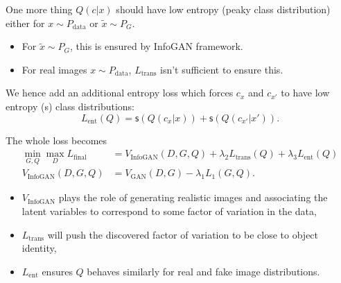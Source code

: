 \documentclass[xcolor={svgnames}]{beamer}
\begin{document}

\begin{frame}{One more thing}
  $Q(c|x)$ should have low entropy (peaky class distribution) either for
  $x \sim P_{\text{data}}$ or $\tilde{x} \sim P_G$.

  \begin{itemize}
    \item For $\tilde{x} \sim P_G$, this is ensured by InfoGAN framework.
    \item For real images $x \sim P_{\text{data}}$, $L_{\text{trans}}$ isn't
      sufficient to ensure this.
  \end{itemize}
  We hence add an additional entropy loss which forces $c_x$ and $c_{x'}$ to 
  have low entropy (s) class distributions:
  \[
    L_{\text{ent}}(Q) = \mathsf{s}(Q(c_x | x)) + \mathsf{s}(Q(c_{x'} | x')).
  \]
\end{frame}


\begin{frame}
  The whole loss becomes
  \[
    \begin{split}
      \min_{G, Q}\max_D L_{\text{final}} &= V_{\text{InfoGAN}}(D, G, Q) + 
      \lambda_2 L_{\text{trans}}(Q) + \lambda_3 L_{\text{ent}}(Q) \\
      V_{\text{InfoGAN}}(D, G, Q) &= 
      V_{\text{GAN}}(D,G) - \lambda_1 L_1(G,Q).
    \end{split}
  \]
  
  \begin{itemize}
    \item $V_{\text{InfoGAN}}$ plays the role of generating realistic images 
      and associating the latent variables to correspond to some factor of 
      variation in the data, 
    \item $L_{\text{trans}}$ will push the discovered factor of variation to 
      be close to object identity,
    \item $L_{\text{ent}}$ ensures $Q$ behaves similarly for real and fake 
      image distributions.
  \end{itemize}
\end{frame}

\end{document}
